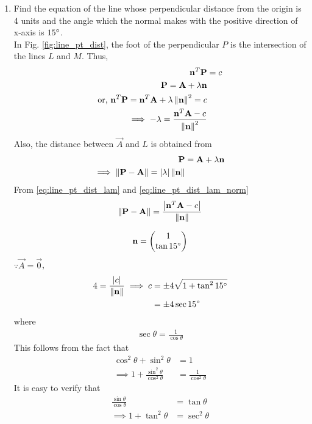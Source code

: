 \documentclass[journal,12pt,twocolumn]{IEEEtran}
\renewcommand\thesection{\arabic{section}}
\begin{document}
\begin{enumerate}[label=\thesection.\arabic*.,ref=\thesection.\theenumi]
\\
\solution 
%
\item Find the equation of the line whose perpendicular distance from the origin is 4 units and the angle which the normal makes with the positive direction of x-axis is $15\degree$.
%
\\
\solution  In Fig. \ref{fig:line_pt_dist}, the foot of the perpendicular $P$ is the intersection of the lines $L$ and $M$.  Thus, 
\begin{align}
\label{eq:line_pt_dist_foot}
\mathbf{n}^T\mathbf{P} &= c
\\
\label{eq:line_pt_dist_foot_normal}
\mathbf{P} = \mathbf{A} + \lambda\mathbf{n}
\\
\text{or, } \mathbf{n}^T\mathbf{P} = \mathbf{n}^T\mathbf{A} + \lambda\left\lVert\mathbf{n}\right\rVert^2 = c
\\
\label{eq:line_pt_dist_lam}
\implies -\lambda = \frac{\mathbf{n}^T\mathbf{A}-c}{\left\lVert\mathbf{n}\right\rVert^2}
\end{align}
%
Also, the distance between $\vec{A}$ and $L$ is obtained from 
%
\begin{align}
\mathbf{P} &= \mathbf{A} + \lambda\mathbf{n}
\\
\label{eq:line_pt_dist_lam_norm}
\implies \left\lVert\mathbf{P} - \mathbf{A}\right\rVert  = \left\vert\lambda\right\vert\left\lVert\mathbf{n}\right\rVert
\end{align}
%
From \eqref{eq:line_pt_dist_lam}
and \eqref{eq:line_pt_dist_lam_norm}
%
\begin{align}
\label{eq:line_pt_dist}
\left\lVert\mathbf{P} - \mathbf{A}\right\rVert  = \frac{\left\vert\mathbf{n}^T\mathbf{A}-c\right\vert}{\left\lVert\mathbf{n}\right\rVert}
\end{align}
%

%
\begin{align}
\mathbf{n} = \begin{pmatrix}1\\\tan 15\degree\end{pmatrix}
\end{align}
%
$\because \vec{A} = \vec{0}$, 
\begin{align}
4 = \frac{\left\vert c\right\vert}{\left\lVert\mathbf{n}\right\rVert} \implies c &= \pm 4\sqrt{1+\tan^2 15\degree} 
\\
&= \pm 4 \sec 15\degree
\end{align}
%
where 
%
\begin{align}
\sec \theta = \frac{1}{\cos \theta}
\end{align}
%
This follows from the fact that
%
\begin{align}
\cos^2 \theta + \sin^2 \theta &= 1
\\
\implies 1 + \frac{\sin^2 \theta}{\cos^2 \theta} &= \frac{1}{\cos^2 \theta}
\end{align}
%
It is easy to verify that 
%
\begin{align}
\frac{\sin \theta}{\cos \theta} &= \tan \theta
\\
\implies 1 + \tan^2 \theta &= \sec^2 \theta
\end{align}
%


\end{enumerate}
\end{document}
